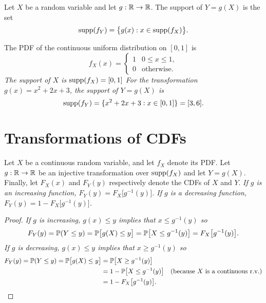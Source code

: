 \begin{remark}
Let $X$ be a random variable and let $g:\mathbb{R}\to\mathbb{R}$. The support of $Y = g(X)$ is the set
\[
\text{supp}(f_Y) = \big\{g(x) : x\in\text{supp}(f_X)\big\}.
\]
\end{remark}

\begin{example}
The PDF of the continuous uniform distribution on $[0,1]$ is
\[
f_X(x) = \left\{\begin{array}{ll}
	1	& 0\leq x\leq 1, \\
	0	& \text{otherwise.}
\end{array}\right.	
\]
\bit
\it The support of $X$ is $\text{supp}(f_X)=[0,1]$
\it For the transformation $g(x)=x^2+2x+3$, the support of $Y=g(X)$ is 
\[
\text{supp}(f_Y) = \{x^2+2x+3 : x\in[0,1]\} = [3,6].
\]
\eit
\end{example}

\section{Transformations of CDFs}

\begin{theorem}\label{thm:transf_cdf}
Let $X$ be a continuous random variable, and let $f_X$ denote its PDF. Let $g:\mathbb{R}\to\mathbb{R}$ be an injective transformation over $\text{supp}(f_X)$ and let $Y=g(X)$. Finally, let $F_X(x)$ and $F_Y(y)$ respectively denote the CDFs of $X$ and $Y$. 
\ben
\it If $g$ is an increasing function, $F_Y(y) = F_X\big[g^{-1}(y)\big]$.
\it If $g$ is a decreasing function, $F_Y(y) = 1 - F_X\big[g^{-1}(y)\big]$.
\een
\end{theorem}

\begin{proof}
\ben
\it If $g$ is increasing, $g(x)\leq y$ implies that $x\leq g^{-1}(y)$ so
\[
F_Y(y) 
	= \mathbb{P}(Y\leq y) 
	= \mathbb{P}\big[g(X)\leq y\big] 
	= \mathbb{P}\big[X\leq g^{-1}(y)\big]
	= F_X\big[g^{-1}(y)\big].
\]
\it If $g$ is decreasing, $g(x)\leq y$ implies that $x\geq g^{-1}(y)$ so
\begin{align*}
F_Y(y) 
	= \mathbb{P}(Y\leq y) 
	= \mathbb{P}\big[g(X)\leq y\big] 
	& = \mathbb{P}\big[X\geq g^{-1}(y)\big] \\
	& = 1 - \mathbb{P}\big[X\leq g^{-1}(y)\big] \quad\text{(because $X$ is a continuous r.v.)}\\
	& = 1 - F_X\big[g^{-1}(y)\big].
\end{align*}
\een
\end{proof}	


